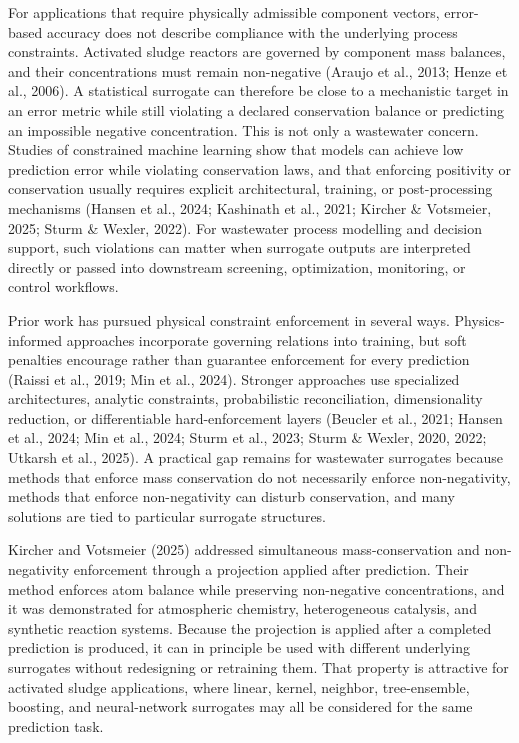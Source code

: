 \documentclass[a4paper,fleqn]{cas-sc}
\begin{document}
For applications that require physically admissible component vectors, error-based accuracy does not describe compliance with the underlying process constraints. Activated sludge reactors are governed by component mass balances, and their concentrations must remain non-negative (Araujo et al., 2013; Henze et al., 2006). A statistical surrogate can therefore be close to a mechanistic target in an error metric while still violating a declared conservation balance or predicting an impossible negative concentration. This is not only a wastewater concern. Studies of constrained machine learning show that models can achieve low prediction error while violating conservation laws, and that enforcing positivity or conservation usually requires explicit architectural, training, or post-processing mechanisms (Hansen et al., 2024; Kashinath et al., 2021; Kircher \& Votsmeier, 2025; Sturm \& Wexler, 2022). For wastewater process modelling and decision support, such violations can matter when surrogate outputs are interpreted directly or passed into downstream screening, optimization, monitoring, or control workflows.

Prior work has pursued physical constraint enforcement in several ways. Physics-informed approaches incorporate governing relations into training, but soft penalties encourage rather than guarantee enforcement for every prediction (Raissi et al., 2019; Min et al., 2024). Stronger approaches use specialized architectures, analytic constraints, probabilistic reconciliation, dimensionality reduction, or differentiable hard-enforcement layers (Beucler et al., 2021; Hansen et al., 2024; Min et al., 2024; Sturm et al., 2023; Sturm \& Wexler, 2020, 2022; Utkarsh et al., 2025). A practical gap remains for wastewater surrogates because methods that enforce mass conservation do not necessarily enforce non-negativity, methods that enforce non-negativity can disturb conservation, and many solutions are tied to particular surrogate structures.

Kircher and Votsmeier (2025) addressed simultaneous mass-conservation and non-negativity enforcement through a projection applied after prediction. Their method enforces atom balance while preserving non-negative concentrations, and it was demonstrated for atmospheric chemistry, heterogeneous catalysis, and synthetic reaction systems. Because the projection is applied after a completed prediction is produced, it can in principle be used with different underlying surrogates without redesigning or retraining them. That property is attractive for activated sludge applications, where linear, kernel, neighbor, tree-ensemble, boosting, and neural-network surrogates may all be considered for the same prediction task.
\end{document}
